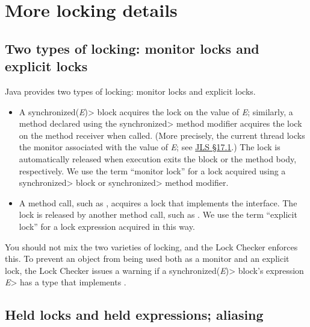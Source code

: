 \section{More locking details\label{lock-details}}

\subsection{Two types of locking:  monitor locks and explicit locks\label{lock-two-types}}

Java provides two types of locking:  monitor locks and explicit locks.

\begin{itemize}
\item
  A \<synchronized(\emph{E})> block acquires the lock on the value of
  \emph{E}; similarly, a method declared using the \<synchronized> method
  modifier acquires the lock on the method receiver when called.
  (More precisely,
  the current thread locks the monitor associated with the value of
  \emph{E}; see \href{https://docs.oracle.com/javase/specs/jls/se8/html/jls-17.html#jls-17.1}{JLS \S17.1}.)
  The lock is automatically released when execution exits the block or the
  method body, respectively.
  We use the term ``monitor lock'' for a lock acquired using a
  \<synchronized>  block or \<synchronized> method modifier.
\item A method call, such as
  ,
  acquires a lock that implements the
  interface.
  The lock is released by another method call, such as
  .
  We use the term ``explicit lock'' for a lock expression acquired in this
  way.
\end{itemize}

You should not mix the two varieties of locking, and the Lock Checker
enforces this.  To prevent an object from being used both as a monitor and
an explicit lock, the Lock Checker issues a warning if a
\<synchronized(\emph{E})> block's expression \<\emph{E}> has a type that
implements .


\subsection{Held locks and held expressions; aliasing\label{lock-aliasing}}

